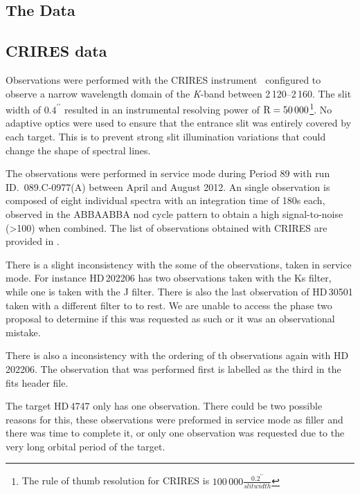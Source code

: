 


\subsection{The Data}

\subsection{CRIRES data}
\label{subsec:CRIRES}
Observations were performed with the {CRIRES} instrument~\citep{kaeufl_crires_2004} configured to observe a narrow wavelength domain of the \emph{K}-band between 2\,120--2\,160\nm{}. The slit width of \(0.4^{\prime\prime}\) resulted in an instrumental resolving power of \(\textrm{R}=50\,000\)\footnote{The rule of thumb resolution for {CRIRES} is \(100\,000\frac{0.2^{\prime\prime}}{slit width}\)}. No adaptive optics were used to ensure that the entrance slit was entirely covered by each target. This is to prevent strong slit illumination variations that could change the shape of spectral lines.

The observations were performed in service mode during Period 89 with run {ID.~089.C-0977(A)} between April and August 2012. An single observation is composed of eight individual spectra with an integration time of 180\si{\second} each, observed in the {ABBAABBA} nod cycle pattern to obtain a high signal-to-noise (>100) when combined. The list of observations obtained with {CRIRES} are provided in .

There is a slight inconsistency with the some of the observations, taken in service mode. For instance {HD\,202206} has two observations taken with the {Ks} filter, while one is taken with the {J} filter. There is also the last observation of {HD\,30501} taken with a different filter to to rest. We are unable to access the phase two proposal to determine if this was requested as such or it was an observational mistake. 

There is also a inconsistency with the ordering of th observations again with {HD\,202206}. The observation that was performed first is labelled as the third in the fits header file.


The target {HD\,4747} only has one observation. There could be two possible reasons for this, these observations were preformed in service mode as filler and there was time to complete it, or only one observation was requested due to the very long orbital period of the target.

